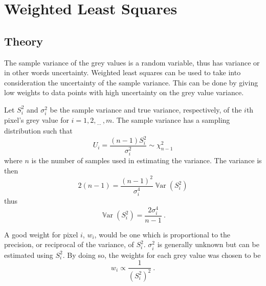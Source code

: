 \documentclass[12pt]{report}
\DeclareMathOperator{\variance}{\mathbb{V}ar}
\newcommand{\dotdotdot}{_{\phantom{.}\cdots}}
\begin{document}
\section{Weighted Least Squares}
\subsection{Theory}
The sample variance of the grey values is a random variable, thus has variance or in other words uncertainty. Weighted least squares can be used to take into consideration the uncertainty of the sample variance. This can be done by giving low weights to data points with high uncertainty on the grey value variance.

Let $S_i^2$ and $\sigma_i^2$ be the sample variance and true variance, respectively, of the $i$th pixel's grey value for $i=1,2,\dotdotdot,m$. The sample variance has a sampling distribution such that
\begin{equation}
U_i=\frac{(n-1)S_i^2}{\sigma_i^2}\sim\chi_{n-1}^2
\end{equation}
where $n$ is the number of samples used in estimating the variance. The variance is then
\begin{equation}
2(n-1)=\frac{(n-1)^2}{\sigma_i^4}\variance\left(S_i^2\right)
\end{equation}
thus
\begin{equation}
\variance\left(S_i^2\right)=\frac{2\sigma_i^4}{n-1} \ .
\end{equation}

A good weight for pixel $i$, $w_i$, would be one which is proportional to the precision, or reciprocal of the variance, of $S_i^2$. $\sigma_i^2$ is generally unknown but can be estimated using $S_i^2$. By doing so, the weights for each grey value was chosen to be
\begin{equation}
w_i \propto \frac{1}{\left(S_i^2\right)^2} \ .
\end{equation}
\end{document}
